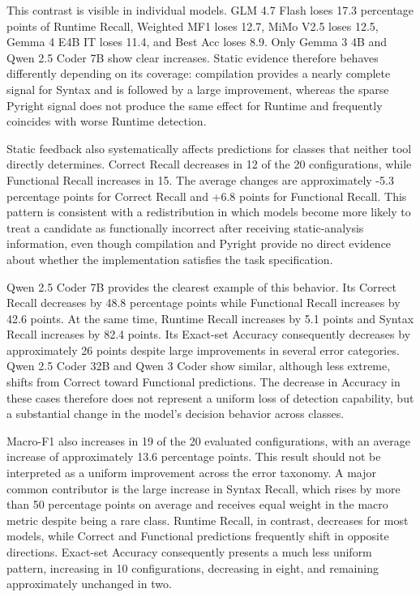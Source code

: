 This contrast is visible in individual models. GLM 4.7 Flash loses 17.3 percentage points of Runtime Recall, Weighted MF1 loses 12.7, MiMo V2.5 loses 12.5, Gemma 4 E4B IT loses 11.4, and Best Acc loses 8.9. Only Gemma 3 4B and Qwen 2.5 Coder 7B show clear increases. Static evidence therefore behaves differently depending on its coverage: compilation provides a nearly complete signal for Syntax and is followed by a large improvement, whereas the sparse Pyright signal does not produce the same effect for Runtime and frequently coincides with worse Runtime detection.

Static feedback also systematically affects predictions for classes that neither tool directly determines. Correct Recall decreases in 12 of the 20 configurations, while Functional Recall increases in 15. The average changes are approximately -5.3 percentage points for Correct Recall and +6.8 points for Functional Recall. This pattern is consistent with a redistribution in which models become more likely to treat a candidate as functionally incorrect after receiving static-analysis information, even though compilation and Pyright provide no direct evidence about whether the implementation satisfies the task specification.

Qwen 2.5 Coder 7B provides the clearest example of this behavior. Its Correct Recall decreases by 48.8 percentage points while Functional Recall increases by 42.6 points. At the same time, Runtime Recall increases by 5.1 points and Syntax Recall increases by 82.4 points. Its Exact-set Accuracy consequently decreases by approximately 26 points despite large improvements in several error categories. Qwen 2.5 Coder 32B and Qwen 3 Coder show similar, although less extreme, shifts from Correct toward Functional predictions. The decrease in Accuracy in these cases therefore does not represent a uniform loss of detection capability, but a substantial change in the model's decision behavior across classes.

Macro-F1 also increases in 19 of the 20 evaluated configurations, with an average increase of approximately 13.6 percentage points. This result should not be interpreted as a uniform improvement across the error taxonomy. A major common contributor is the large increase in Syntax Recall, which rises by more than 50 percentage points on average and receives equal weight in the macro metric despite being a rare class. Runtime Recall, in contrast, decreases for most models, while Correct and Functional predictions frequently shift in opposite directions. Exact-set Accuracy consequently presents a much less uniform pattern, increasing in 10 configurations, decreasing in eight, and remaining approximately unchanged in two.

